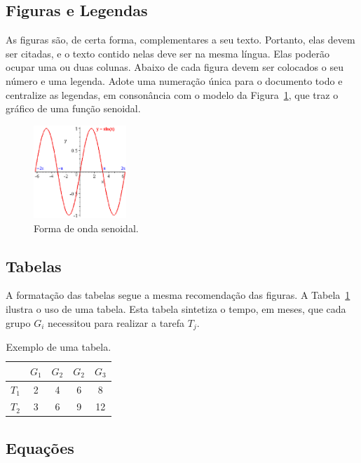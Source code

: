 \documentclass[11pt]{article}
\begin{document}
\subsection{Figuras e Legendas}
\label{sec:figuras}

As figuras são, de certa forma, complementares a seu texto.  Portanto,
elas devem ser citadas, e o texto contido nelas deve ser na mesma
língua. Elas poderão ocupar uma ou duas colunas.  Abaixo de cada
figura devem ser colocados o seu número e uma legenda.  Adote uma
numeração única para o documento todo e centralize as legendas, em
consonância com o modelo da Figura~\ref{fig:forma_de_onda}, que traz o
gráfico de uma função senoidal.

  \begin{figure}[H]
        {\centering
        \includegraphics[height=35mm]{sin.pdf}
        \caption{Forma de onda senoidal.}
        \label{fig:forma_de_onda}\par}
  \end{figure}

\subsection{Tabelas}
\label{ssec:tabelas}

A formatação das tabelas segue a mesma recomendação das figuras.
A Tabela~\ref{tab:ex} ilustra o uso de uma tabela. Esta tabela sintetiza
o tempo, em meses, que cada grupo $G_i$ necessitou para realizar a
tarefa $T_j$.

\begin{table}[H]
  {\centering
  \begin{tabular}{|c|c|c|c|c|}
  \hline
   & $G_1$ & $G_2$ & $G_2$ & $G_3$ \\
  \hline
  $T_1$ & 2 & 4 & 6 & 8 \\
  \hline
  $T_2$ & 3 & 6 & 9 & 12 \\
  \hline
  \end{tabular}
\caption{Exemplo de uma tabela.}
\label{tab:ex}
\par}
\end{table}

\subsection{Equações}
\label{ssec:equacoes}
\end{document}
